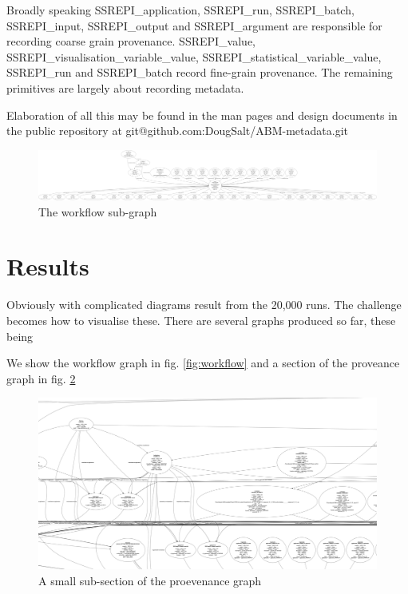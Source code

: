 \documentclass[runningheads]{llncs}
\begin{document}
Broadly speaking SSREPI\_application, SSREPI\_run, SSREPI\_batch, SSREPI\_input,
SSREPI\_output and SSREPI\_argument are responsible for recording coarse grain
provenance. SSREPI\_value, SSREPI\_visualisation\_variable\_value, SSREPI\_statistical\_variable\_value, SSREPI\_run and SSREPI\_batch record fine-grain provenance. The remaining
primitives are largely about recording metadata.

Elaboration of all this may be found in the man pages and design documents in the public repository at git@github.com:DougSalt/ABM-metadata.git

\begin{figure}
\includegraphics[width=\textwidth]{img/workflow.pdf}
\caption{The workflow sub-graph} \label{fig:workflow.pdf}
\end{figure}


\section{Results}

Obviously with complicated diagrams result from the 20,000 runs. The challenge becomes how to visualise these.
There are several graphs produced so far, these being 

We show the workflow graph in fig. \ref{fig:workflow} and a section of the
proveance graph in fig. \ref{fig:sub-provenance}

\begin{figure}
\includegraphics[width=\textwidth]{img/subsection-of-provenance.png}
\caption{A small sub-section of the proevenance graph} \label{fig:sub-provenance}
\end{figure}
\end{document}
